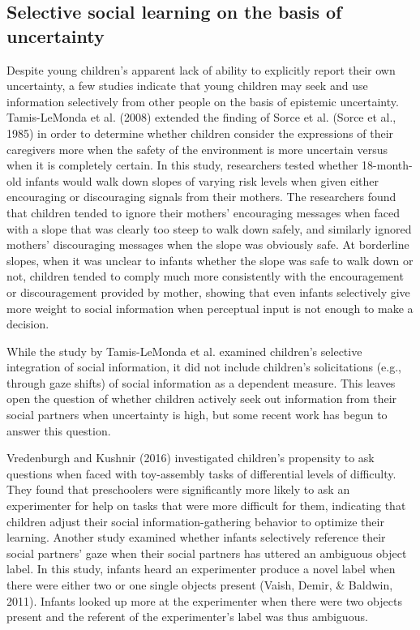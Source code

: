 \documentclass[man]{apa6}
\theoremstyle{definition}
\theoremstyle{definition}
\theoremstyle{definition}
\theoremstyle{remark}
\begin{document}
\subsection{Selective social learning on the basis of
uncertainty}\label{selective-social-learning-on-the-basis-of-uncertainty}

Despite young children's apparent lack of ability to explicitly report
their own uncertainty, a few studies indicate that young children may
seek and use information selectively from other people on the basis of
epistemic uncertainty. Tamis-LeMonda et al. (2008) extended the finding
of Sorce et al. (Sorce et al., 1985) in order to determine whether
children consider the expressions of their caregivers more when the
safety of the environment is more uncertain versus when it is completely
certain. In this study, researchers tested whether 18-month-old infants
would walk down slopes of varying risk levels when given either
encouraging or discouraging signals from their mothers. The researchers
found that children tended to ignore their mothers' encouraging messages
when faced with a slope that was clearly too steep to walk down safely,
and similarly ignored mothers' discouraging messages when the slope was
obviously safe. At borderline slopes, when it was unclear to infants
whether the slope was safe to walk down or not, children tended to
comply much more consistently with the encouragement or discouragement
provided by mother, showing that even infants selectively give more
weight to social information when perceptual input is not enough to make
a decision.

While the study by Tamis-LeMonda et al. examined children's selective
integration of social information, it did not include children's
solicitations (e.g., through gaze shifts) of social information as a
dependent measure. This leaves open the question of whether children
actively seek out information from their social partners when
uncertainty is high, but some recent work has begun to answer this
question.

Vredenburgh and Kushnir (2016) investigated children's propensity to ask
questions when faced with toy-assembly tasks of differential levels of
difficulty. They found that preschoolers were significantly more likely
to ask an experimenter for help on tasks that were more difficult for
them, indicating that children adjust their social information-gathering
behavior to optimize their learning. Another study examined whether
infants selectively reference their social partners' gaze when their
social partners has uttered an ambiguous object label. In this study,
infants heard an experimenter produce a novel label when there were
either two or one single objects present (Vaish, Demir, \& Baldwin,
2011). Infants looked up more at the experimenter when there were two
objects present and the referent of the experimenter's label was thus
ambiguous.
\end{document}

